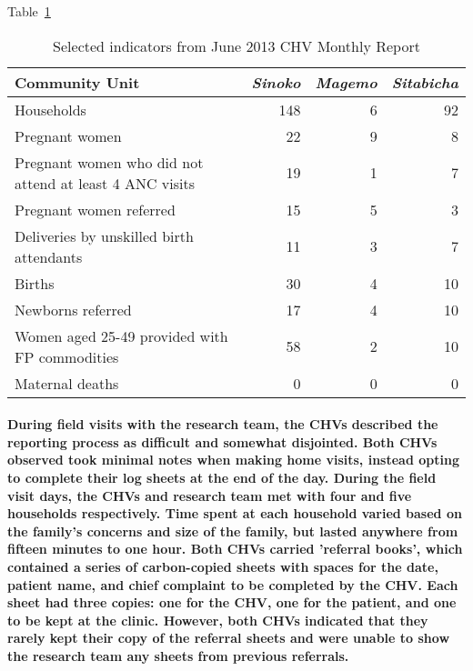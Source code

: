 Table~\ref{tab:chvreport}
\begin{table}[]
  \centering
  \caption{Selected indicators from June 2013 CHV Monthly Report}
    \begin{tabular}{lrrr}
    \toprule
    \textbf{Community Unit} & \textit{Sinoko} & \textit{Magemo} & \textit{Sitabicha} \\
    \midrule
    Households & 148   & 6     & 92 \\
    Pregnant women & 22    & 9     & 8 \\
    Pregnant women who did not attend at least 4 ANC visits & 19    & 1     & 7 \\
    Pregnant women referred & 15    & 5     & 3 \\
    Deliveries by unskilled birth attendants & 11    & 3     & 7 \\
    Births & 30    & 4     & 10 \\
    Newborns referred & 17    & 4     & 10 \\
    Women aged 25-49 provided with FP commodities & 58    & 2     & 10 \\
    Maternal deaths & 0     & 0     & 0 \\
    \bottomrule
    \end{tabular}%
  \label{tab:chvreport}%
\end{table}%


\paragraph{During field visits with the research team, the CHVs described the reporting process as difficult and somewhat disjointed. Both CHVs observed took minimal notes when making home visits, instead opting to complete their log sheets at the end of the day. During the field visit days, the CHVs and research team met with four and five households respectively. Time spent at each household varied based on the family's concerns and size of the family, but lasted anywhere from fifteen minutes to one hour. Both CHVs carried 'referral books', which contained a series of carbon-copied sheets with spaces for the date, patient name, and chief complaint to be completed by the CHV. Each sheet had three copies: one for the CHV, one for the patient, and one to be kept at the clinic. However, both CHVs indicated that they rarely kept their copy of the referral sheets and were unable to show the research team any sheets from previous referrals.}

